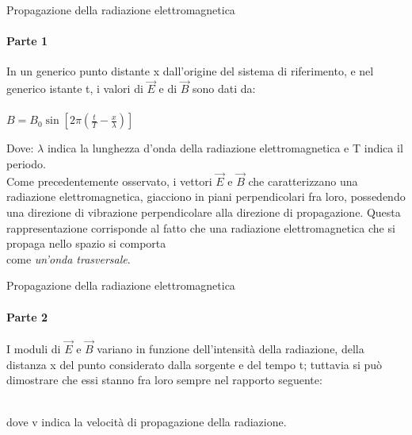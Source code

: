 \documentclass[aspectratio=169]{beamer}
\newcommand*{\vet}{\fontfamily{qzc}\selectfont}
\begin{document}
\begin{frame}{Propagazione della radiazione elettromagnetica}
	\framesubtitle{Parte 1}
	In un generico punto distante {\vet x} dall'origine del sistema di riferimento, e nel generico istante {\vet t}, i valori di $\vec{E}$ e di $\vec{B}$ sono dati da:\\
	\medskip
	\\
	\smallskip
	{\textcolor{red!80}{$ B = B_{0} \sin [2 \pi (\frac{t}{T} - \frac{x}{\lambda})]$}}\\
	\raggedright
	\medskip
	Dove: $\lambda$ indica la lunghezza d'onda della radiazione elettromagnetica e T indica il periodo.\\
	\medskip
	Come precedentemente osservato, i vettori $\vec{E}$ e $\vec{B}$ che caratterizzano una radiazione elettromagnetica, giacciono in piani perpendicolari fra loro, possedendo una direzione di vibrazione perpendicolare alla direzione di propagazione. Questa rappresentazione corrisponde al fatto che una radiazione elettromagnetica che si propaga nello spazio si comporta\\ come \emph{un'onda trasversale}.
\end{frame}

\begin{frame}{Propagazione della radiazione elettromagnetica}
	\framesubtitle{Parte 2}
	I moduli di $\vec{E}$ e $\vec{B}$ variano in funzione dell'intensità della radiazione, della distanza {\vet x} del punto considerato dalla sorgente e del tempo {\vet t}; tuttavia si può dimostrare che essi stanno fra loro sempre nel rapporto seguente:\\
	\medskip
	\centering{{\textcolor{red!80}{{\vet v} = $\frac{E}{B}$}}}\\
	\medskip
	\raggedright{dove {\vet v} indica la velocità di propagazione della radiazione.}\\
\end{frame}
\end{document}
